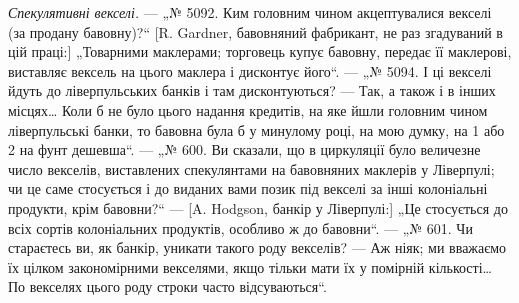 \emph{Спекулятивні векселі.} — „№ 5092. Ким головним чином акцептувалися векселі (за продану бавовну)?“ [R.
Gardner, бавовняний фабрикант, не раз згадуваний в цій праці:] „Товарними маклерами; торговець купує
бавовну,
передає її маклерові, виставляє вексель на цього маклера і дисконтує його“. — „№ 5094. І ці векселі
йдуть до ліверпульських банків і там дисконтуються? — Так, а також і в інших місцях\dots{} Коли б не
було цього надання кредитів, на яке
йшли головним чином ліверпульські банки, то бавовна була б у минулому році,
на мою думку, на 1 або 2 на фунт дешевша“. — „№ 600. Ви сказали,
що в циркуляції було величезне число векселів, виставлених спекулянтами на
бавовняних маклерів у Ліверпулі; чи це саме стосується і до виданих вами
позик під векселі за інші колоніальні продукти, крім бавовни?“ — [A. Hodgson,
банкір у Ліверпулі:] „Це стосується до всіх сортів колоніальних продуктів,
особливо ж до бавовни“. — „№ 601. Чи стараєтесь ви, як банкір, уникати
такого роду векселів? — Аж ніяк; ми вважаємо їх цілком закономірними векселями, якщо тільки мати їх
у помірній кількості\dots{} По векселях цього роду
строки часто відсуваються“.

